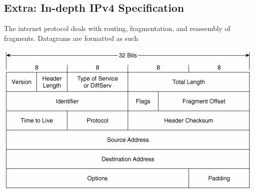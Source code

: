 \subsection{Extra: In-depth IPv4 Specification}

The internet protocol deals with routing, fragmentation, and reassembly of fragments.
Datagrams are formatted as such

\begin{center}
\includegraphics[width=.8\textwidth]{networking/images/ipv4_header.png}
\end{center}

